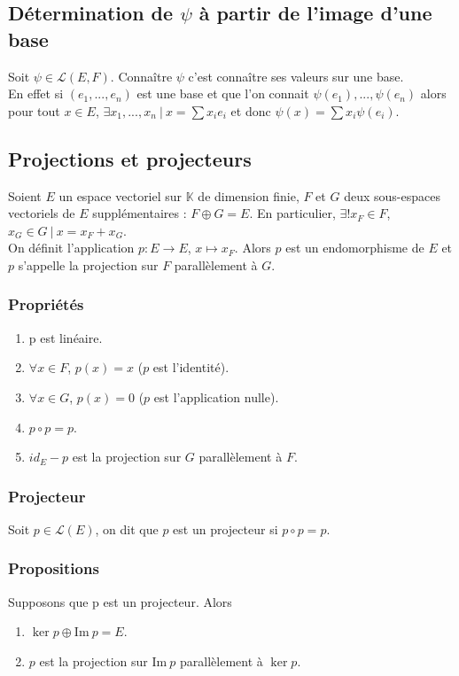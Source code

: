 \documentclass[a4paper,10pt]{book} %
\newcommand{\K}{\mathbb{K}}
\newcommand{\ev}{espace vectoriel }
\newcommand{\sevs}{sous-espaces vectoriels }
\newcommand{\tq}{~|~}
\newcommand{\Ima}{\mathrm{Im}~} %
\begin{document}
\newpage

\subsection{Détermination de $\psi$ à partir de l'image d'une base}
Soit $\psi\in \mathcal{L}(E,F)$. Connaître $\psi$ c'est connaître ses valeurs sur une base.\\

En effet si $(e_1,...,e_n)$ est une base et que l'on connait $\psi(e_1),...,\psi(e_n)$ alors pour tout $x\in E$, $\exists x_1,...,x_n \tq x=\sum x_ie_i$ et donc $\psi(x)=\sum x_i\psi(e_i)$.

\subsection{Projections et projecteurs}
Soient $E$ un \ev sur $\K$ de dimension finie, $F$ et $G$ deux \sevs de $E$ supplémentaires : $F\oplus G=E$. En particulier, $\exists! x_F\in F$, $x_G\in G \tq x=x_F+x_G$.\\

On définit l'application $p : E\rightarrow E$, $x\mapsto x_F$. Alors $p$ est un endomorphisme de $E$ et $p$ s'appelle la projection sur $F$ parallèlement à $G$.

\subsubsection{Propriétés}
\begin{enumerate}
\item p est linéaire.
\item $\forall x\in F$, $p(x)=x$ ($p$ est l'identité).
\item $\forall x\in G$, $p(x)=0$ ($p$ est l'application nulle).
\item $p\circ p=p$.
\item $id_E -p$ est la projection sur $G$ parallèlement à $F$.
\end{enumerate}

\subsubsection{Projecteur}
Soit $p\in \mathcal{L}(E)$, on dit que $p$ est un projecteur si $p\circ p =p$.

\subsubsection{Propositions}
Supposons que p est un projecteur. Alors
\begin{enumerate}
\item $\ker p\oplus \Ima p=E$.
\item $p$ est la projection sur $\Ima p$ parallèlement à $\ker p$.
\end{enumerate}
\end{document}
